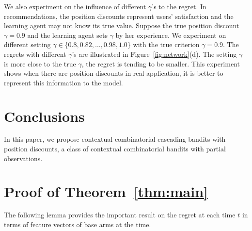\documentclass{article}
\begin{document}
We also experiment on the influence of different $\gamma$'s to the regret. In recommendations, the position discounts represent users' satisfaction and the learning agent may not know its true value. Suppose the true position discount $\gamma = 0.9$ and the learning agent sets $\gamma$ by her experience. We experiment on different setting $\gamma \in \{0.8, 0.82, \ldots, 0.98, 1.0\}$ with the true criterion $\gamma = 0.9$. The regrets with different $\gamma$'s are illustrated in Figure~\ref{fig:network}(d). The setting $\gamma$ is more close to the true $\gamma$, the regret is tending to be smaller. This experiment shows when there are position discounts in real application, it is better to represent this information to the model.




\section{Conclusions}

In this paper, we propose contextual combinatorial cascading bandits with position discounts, a class of contextual combinatorial bandits with partial observations. 


	



\appendix

\section{Proof of Theorem~\ref{thm:main}}

The following lemma provides the important result on the regret at each time $t$ in terms of feature vectors of base arms at the time.
\end{document}

